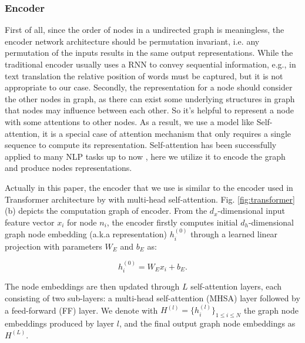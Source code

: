 \subsubsection{Encoder}
\label{sec:encoder}
First of all, since the order of nodes in a undirected graph is meaningless,
the encoder network architecture should be permutation invariant,
i.e. any permutation of the inputs results in the same output representations. 
While the traditional encoder usually uses a RNN to convey sequential information, e.g., in text translation the relative position of words must be captured,
but it is not appropriate to our case.
Secondly, the representation for a node should consider the other nodes in graph, as there can exist some underlying structures in graph that nodes may influence between each other.
So it's helpful to represent a node with some attentions to other nodes.
As a result, we use a model like Self-attention,
it is a special case of attention mechanism that only requires a single sequence to compute its representation.
Self-attention has been successfully applied to many NLP tasks up to now \cite{yang2018query}, here we utilize it to encode the graph and produce nodes representations. 

Actually in this paper, the encoder that we use is similar
to the encoder used in Transformer architecture 
by \cite{vaswani2017attention} with multi-head self-attention.
Fig. \ref{fig:transformer}(b) depicts the computation graph of encoder.
From the $d_x$-dimensional input feature vector $x_i$ for node $n_i$, the encoder firstly computes initial $d_h$-dimensional graph node embedding (a.k.a representation) $h_i^{(0)}$ through a learned linear projection with parameters $W_E$ and $b_E$ as:
\begin{small}
\begin{equation}
	h_i^{(0)} = W_Ex_i + b_E.
\end{equation}
\end{small}
The node embeddings are then updated through $L$ self-attention layers, each consisting of two sub-layers:
a multi-head self-attention (MHSA) layer followed by a feed-forward (FF) layer.
We denote with $H^{(l)}=\{h^{(l)}_i\}_{1\leq i\leq N}$ the graph node embeddings produced by layer $l$,
and the final output graph node embeddings as $H^{(L)}$.

